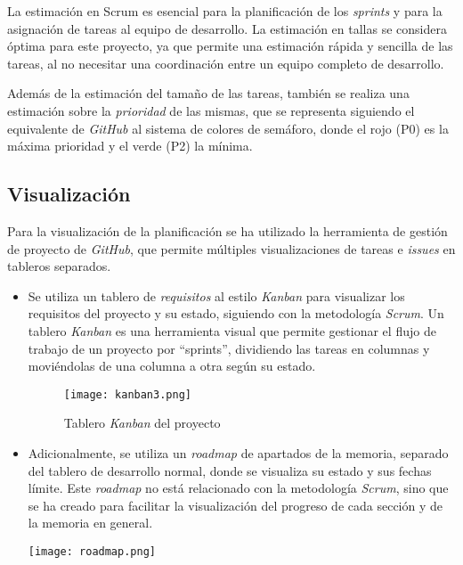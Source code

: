 La estimación en Scrum es esencial para la planificación de los \textit{sprints}
y para la asignación de tareas al equipo de desarrollo. La estimación en tallas
se considera óptima para este proyecto, ya que permite una estimación rápida y
sencilla de las tareas, al no necesitar una coordinación entre un equipo
completo de desarrollo.

Además de la estimación del tamaño de las tareas, también se realiza una
estimación sobre la \textit{prioridad} de las mismas, que se representa
siguiendo el equivalente de \textit{GitHub} al sistema de colores de semáforo,
donde el rojo (P0) es la máxima prioridad y el verde (P2) la mínima.

\newpage{}
\subsection{Visualización}\label{subsec:visual_planif}
Para la visualización de la planificación se ha utilizado la herramienta de
gestión de proyecto de \textit{GitHub}, que permite múltiples visualizaciones de
tareas e \textit{issues} en tableros separados.

\begin{itemize}
	\item Se utiliza un tablero de \textit{requisitos} al estilo \textit{Kanban}
		para visualizar los requisitos del proyecto y su estado, siguiendo con
		la metodología \textit{Scrum}. Un tablero \textit{Kanban} es una
		herramienta visual que permite gestionar el flujo de trabajo de un
		proyecto por ``sprints'', dividiendo las tareas en columnas y
		moviéndolas de una columna a otra según su estado.

		\begin{figure}[H]
			\centering
			\texttt{[image: kanban3.png]}
			\caption{Tablero \textit{Kanban} del proyecto}
			\label{fig:kanban}
		\end{figure}
	\item Adicionalmente, se utiliza un \textit{roadmap} de apartados de la
		memoria, separado del tablero de desarrollo normal, donde se visualiza
		su estado y sus fechas límite. Este \textit{roadmap} no está relacionado
		con la metodología \textit{Scrum}, sino que se ha creado para facilitar
		la visualización del progreso de cada sección y de la memoria en general.

		\begin{minipage}{\linewidth}
			\centering
			\texttt{[image: roadmap.png]}
		\end{minipage}
\end{itemize}



